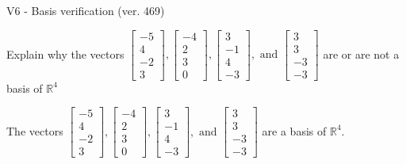 \begin{exercise}
  \begin{exerciseTitle}V6 - Basis verification (ver. 469)\end{exerciseTitle}
  \begin{exerciseStatement}
    Explain why the vectors \(\left[\begin{array}{r}
-5 \\
4 \\
-2 \\
3
\end{array}\right] , \left[\begin{array}{r}
-4 \\
2 \\
3 \\
0
\end{array}\right] , \left[\begin{array}{r}
3 \\
-1 \\
4 \\
-3
\end{array}\right] , \text{ and } \left[\begin{array}{r}
3 \\
3 \\
-3 \\
-3
\end{array}\right]\) are or are not a basis of \(\mathbb{R}^4\)	


  \end{exerciseStatement}
  \begin{exerciseAnswer}
   The vectors \(\left[\begin{array}{r}
-5 \\
4 \\
-2 \\
3
\end{array}\right] , \left[\begin{array}{r}
-4 \\
2 \\
3 \\
0
\end{array}\right] , \left[\begin{array}{r}
3 \\
-1 \\
4 \\
-3
\end{array}\right] , \text{ and } \left[\begin{array}{r}
3 \\
3 \\
-3 \\
-3
\end{array}\right]\) 
  	 are  a basis of \(\mathbb{R}^4\).
  


  \end{exerciseAnswer}
\end{exercise}